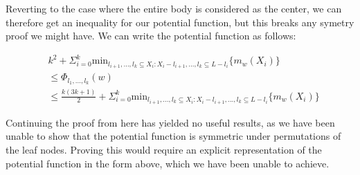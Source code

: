 Reverting to the case where the entire body is considered as the center, we can therefore get an inequality for our potential function, but this breaks any symetry proof we might have. We can write the potential function as follows:

\begin{equation*}
    \begin{split}
        &k^2 + \Sigma_{i=0}^k \mathrm{min}_{l_{i+1}, ..., l_k \subseteq X_i : X_i - l_{i+1}, ..., l_k \subseteq L - l_i} \{ m_w(X_i)\} \\
        &\leq \Phi_{l_1, ..., l_k} (w)  \\
        &\leq \frac{k(3k+1)}{2} + \Sigma_{i=0}^k \mathrm{min}_{l_{i+1}, ..., l_k \subseteq X_i : X_i - l_{i+1}, ..., l_k \subseteq L - l_i} \{ m_w(X_i)\}
    \end{split}
\end{equation*}

Continuing the proof from here has yielded no useful results, as we have been unable to show that the potential function is symmetric under permutations of the leaf nodes. Proving this would require an explicit representation of the potential function in the form above, which we have been unable to achieve.